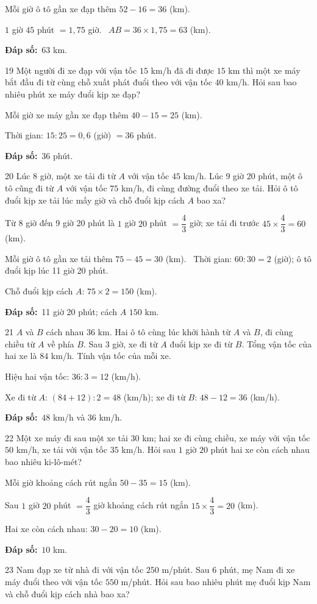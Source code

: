 \documentclass[11pt]{article}
\newif\ifsol \solfalse
\providecommand{\AnsWord}{Đáp số}
\newcommand{\dapso}[1]{\par\textbf{\AnsWord:}\ #1}
\newcommand{\probsol}[1]{%
  \begin{lrbox}{\solmeasure}\begin{minipage}{\dimexpr\linewidth-24pt\relax}#1\end{minipage}\end{lrbox}%
  \ifsol
    \begin{solbox}#1\end{solbox}%
  \else
    \setlength{\solht}{\dimexpr\ht\solmeasure+\dp\solmeasure+0.85cm\relax}%
    \ifdim\solht<1.35cm\setlength{\solht}{1.35cm}\fi
    \begin{tcolorbox}[colback=white,colframe=Line,boxrule=0.8pt,arc=5pt,
      left=8pt,right=8pt,top=4pt,bottom=4pt,height=\solht]{\footnotesize\color{Slate}\itshape\WorkWord}\end{tcolorbox}%
  \fi}
\newcommand{\gap}{\vspace{0.3cm}}
\def\WorkWord{Bài làm:}
\def\AnsWord{Đáp số}
\begin{document}
\probsol{
Mỗi giờ ô tô gần xe đạp thêm $52-16=36$ (km).\par $1$ giờ $45$ phút $=1{,}75$ giờ. \ $AB=36\times1{,}75=63$ (km).
\dapso{$63$ km.}}
\gap
\begin{probbox}{19}{\relax}
Một người đi xe đạp với vận tốc $15$ km/h đã đi được $15$ km thì một xe máy bắt đầu đi từ cùng chỗ xuất phát đuổi theo với vận tốc $40$ km/h. Hỏi sau bao nhiêu phút xe máy đuổi kịp xe đạp?
\end{probbox}
\probsol{
Mỗi giờ xe máy gần xe đạp thêm $40-15=25$ (km).\par Thời gian: $15:25=0{,}6$ (giờ) $=36$ phút.
\dapso{$36$ phút.}}
\gap
\begin{probbox}{20}{\relax}
Lúc 8 giờ, một xe tải đi từ $A$ với vận tốc $45$ km/h. Lúc 9 giờ 20 phút, một ô tô cũng đi từ $A$ với vận tốc $75$ km/h, đi cùng đường đuổi theo xe tải. Hỏi ô tô đuổi kịp xe tải lúc mấy giờ và chỗ đuổi kịp cách $A$ bao xa?
\end{probbox}
\probsol{
Từ 8 giờ đến 9 giờ 20 phút là $1$ giờ $20$ phút $=\dfrac43$ giờ; xe tải đi trước $45\times\dfrac43=60$ (km).\par
Mỗi giờ ô tô gần xe tải thêm $75-45=30$ (km). \ Thời gian: $60:30=2$ (giờ); ô tô đuổi kịp lúc 11 giờ 20 phút.\par
Chỗ đuổi kịp cách $A$: $75\times2=150$ (km).
\dapso{11 giờ 20 phút; cách $A$ $150$ km.}}
\gap
\begin{probbox}{21}{\relax}
$A$ và $B$ cách nhau $36$ km. Hai ô tô cùng lúc khởi hành từ $A$ và $B$, đi cùng chiều từ $A$ về phía $B$. Sau $3$ giờ, xe đi từ $A$ đuổi kịp xe đi từ $B$. Tổng vận tốc của hai xe là $84$ km/h. Tính vận tốc của mỗi xe.
\end{probbox}
\probsol{
Hiệu hai vận tốc: $36:3=12$ (km/h).\par
Xe đi từ $A$: $(84+12):2=48$ (km/h); xe đi từ $B$: $48-12=36$ (km/h).
\dapso{$48$ km/h và $36$ km/h.}}
\gap
\begin{probbox}{22}{\relax}
Một xe máy đi sau một xe tải $30$ km; hai xe đi cùng chiều, xe máy với vận tốc $50$ km/h, xe tải với vận tốc $35$ km/h. Hỏi sau $1$ giờ $20$ phút hai xe còn cách nhau bao nhiêu ki-lô-mét?
\end{probbox}
\probsol{
Mỗi giờ khoảng cách rút ngắn $50-35=15$ (km).\par Sau $1$ giờ $20$ phút $=\dfrac43$ giờ khoảng cách rút ngắn $15\times\dfrac43=20$ (km).\par Hai xe còn cách nhau: $30-20=10$ (km).
\dapso{$10$ km.}}
\gap
\begin{probbox}{23}{\relax}
Nam đạp xe từ nhà đi với vận tốc $250$ m/phút. Sau $6$ phút, mẹ Nam đi xe máy đuổi theo với vận tốc $550$ m/phút. Hỏi sau bao nhiêu phút mẹ đuổi kịp Nam và chỗ đuổi kịp cách nhà bao xa?
\end{probbox}
\end{document}
